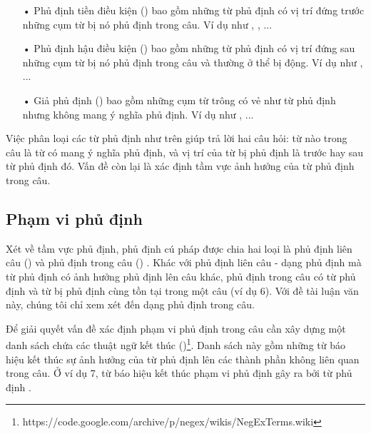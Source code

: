 \begin{itemize}
\item[•] Phủ định tiền điều kiện () bao gồm những từ phủ định có vị trí đứng trước những cụm từ bị nó phủ định trong câu. Ví dụ như , , ...
\item[•] Phủ định hậu điều kiện () bao gồm những từ phủ định có vị trí đứng sau những cụm từ bị nó phủ định trong câu và thường ở thể bị động. Ví dụ như , ...
\item[•] Giả phủ định () bao gồm những cụm từ trông có vẻ như từ phủ định nhưng không mang ý nghĩa phủ định. Ví dụ như , ...
\end{itemize}

Việc phân loại các từ phủ định như trên giúp trả lời hai câu hỏi: từ nào trong câu là từ có mang ý nghĩa phủ định, và vị trí của từ bị phủ định là trước hay sau từ phủ định đó. Vấn đề còn lại là xác định tầm vực ảnh hưởng của từ phủ định trong câu.

\subsection*{Phạm vi phủ định}

Xét về tầm vực phủ định, phủ định cú pháp được chia hai loại là phủ định liên câu () và phủ định trong câu () \cite{Councill2010}. Khác với phủ định liên câu - dạng phủ định mà từ phủ định có ảnh hưởng phủ định lên câu khác, phủ định trong câu có từ phủ định và từ bị phủ định cùng tồn tại trong một câu (ví dụ 6). Với đề tài luận văn này, chúng tôi chỉ xem xét đến dạng phủ định trong câu.


Để giải quyết vấn đề xác định phạm vi phủ định trong câu cần xây dựng một danh sách chứa các thuật ngữ kết thúc ()\footnote{https://code.google.com/archive/p/negex/wikis/NegExTerms.wiki}. Danh sách này gồm những từ báo hiệu kết thúc sự ảnh hưởng của từ phủ định lên các thành phần không liên quan trong câu. Ở ví dụ 7, từ  báo hiệu kết thúc phạm vi phủ định gây ra bởi từ phủ định .

